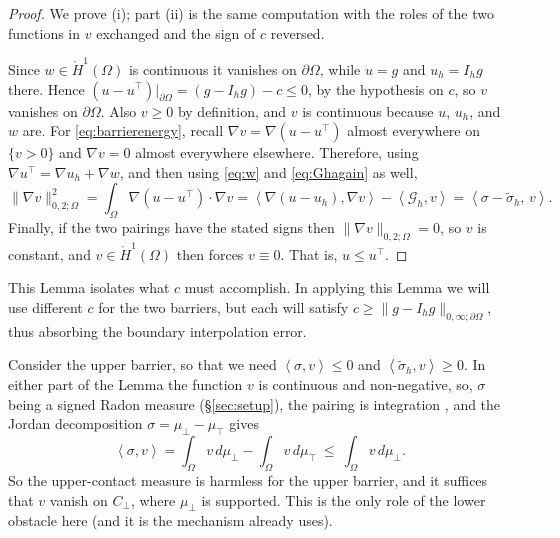\documentclass[12pt]{amsart}
\theoremstyle{definition}
\newcommand{\Om}{\Omega}
\newcommand{\dOm}{\partial\Omega}
\newcommand{\Cbot}{C_\bot}
\newcommand{\Ih}{I_h}
\newcommand{\Gh}{\mathcal{G}_h}
\begin{document}
\begin{proof}
We prove (i); part (ii) is the same computation with the roles of the two functions in $v$ exchanged and the sign of $c$ reversed.

Since $w \in \mathring H^1(\Om)$ is continuous it vanishes on $\dOm$, while $u = g$ and $u_h = \Ih g$ there.  Hence $(u - u^\top)|_{\dOm} = (g - \Ih g) - c \le 0$, by the hypothesis on $c$, so $v$ vanishes on $\dOm$.  Also $v \ge 0$ by definition, and $v$ is continuous because $u$, $u_h$, and $w$ are.  For \eqref{eq:barrierenergy}, recall $\nabla v = \nabla(u-u^\top)$ almost everywhere on $\{v > 0\}$ and $\nabla v = 0$ almost everywhere elsewhere.  Therefore, using $\nabla u^\top = \nabla u_h + \nabla w$, and then using \eqref{eq:w} and \eqref{eq:Ghagain} as well,
\[
  \|\nabla v\|_{0,2;\Om}^2 = \int_\Om \nabla(u - u^\top)\cdot\nabla v
  = \left<\nabla(u-u_h),\nabla v\right> - \left<\Gh,v\right>
  = \left<\sigma - \tilde\sigma_h,\,v\right>.
\]
Finally, if the two pairings have the stated signs then $\|\nabla v\|_{0,2;\Om} = 0$, so $v$ is constant, and $v \in \mathring H^1(\Om)$ then forces $v \equiv 0$.  That is, $u \le u^\top$.
\end{proof}

This Lemma isolates what $c$ must accomplish.  In applying this Lemma we will use different $c$ for the two barriers, but each will satisfy $c \ge \|g - \Ih g\|_{0,\infty;\dOm}$, thus absorbing the boundary interpolation error.

Consider the upper barrier, so that we need $\left<\sigma,v\right> \le 0$ and $\left<\tilde\sigma_h,v\right> \ge 0$.  In either part of the Lemma the function $v$ is continuous and non-negative, so, $\sigma$ being a signed Radon measure (\S \ref{sec:setup}), the pairing is integration \cite[Theorem 6.9]{KinderlehrerStampacchia1980}, and the Jordan decomposition $\sigma = \mu_\bot - \mu_\top$ gives
\begin{equation}
\label{eq:sigmapairing}
  \left<\sigma,v\right> = \int_\Om v\,d\mu_\bot - \int_\Om v\,d\mu_\top \ \le\ \int_\Om v\,d\mu_\bot .
\end{equation}
So the upper-contact measure is harmless for the upper barrier, and it suffices that $v$ vanish on $\Cbot$, where $\mu_\bot$ is supported.  This is the only role of the lower obstacle here (and it is the mechanism \cite{NSV03} already uses).
\end{document}
